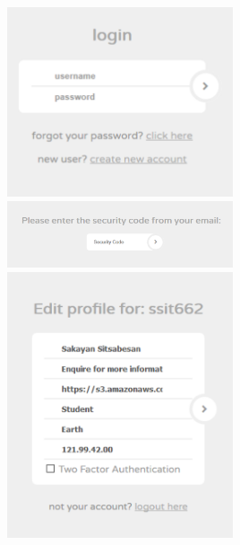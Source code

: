 \documentclass[a4paper,10pt,twoside]{article}
\begin{document}
\begin{center}

\includegraphics[width=0.5\textwidth]{appendix1.png}\\

\includegraphics[width=0.5\textwidth]{appendix2.png}\\

\includegraphics[width=0.5\textwidth]{appendix3.png}\\

\newpage


\end{center}
\end{document}
